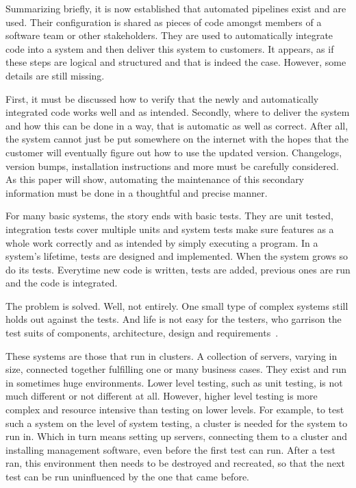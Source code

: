 Summarizing briefly, it is now established that automated pipelines exist and are used.
Their configuration is shared as pieces of code amongst members of a software team or other stakeholders.
They are used to automatically integrate code into a system and then deliver this system to customers.
It appears, as if these steps are logical and structured and that is indeed the case.
However, some details are still missing.

First, it must be discussed how to verify that the newly and automatically integrated code works well and as intended.
Secondly, where to deliver the system and how this can be done in a way, that is automatic as well as correct.
After all, the system cannot just be put somewhere on the internet with the hopes that the customer will eventually figure out how to use the updated version.
Changelogs, version bumps, installation instructions and more must be carefully considered.
As this paper will show, automating the maintenance of this secondary information must be done in a thoughtful and precise manner.

For many basic systems, the story ends with basic tests.
They are unit tested, integration tests cover multiple units and system tests make sure features as a whole work correctly and as intended by simply executing a program.
In a system's lifetime, tests are designed and implemented.
When the system grows so do its tests.
Everytime new code is written, tests are added, previous ones are run and the code is integrated.

The problem is solved.
Well, not entirely.
One small type of complex systems still holds out against the tests.
And life is not easy for the testers, who garrison the test suits of components, architecture, design and requirements~\cite{AsterixBeginningSentence}.

\pagebreak

These systems are those that run in clusters.
A collection of servers, varying in size, connected together fulfilling one or many business cases.
They exist and run in sometimes huge environments.
Lower level testing, such as unit testing, is not much different or not different at all.
However, higher level testing is more complex and resource intensive than testing on lower levels.
For example, to test such a system on the level of system testing, a cluster is needed for the system to run in.
Which in turn means setting up servers, connecting them to a cluster and installing management software, even before the first test can run.
After a test ran, this environment then needs to be destroyed and recreated, so that the next test can be run uninfluenced by the one that came before.

